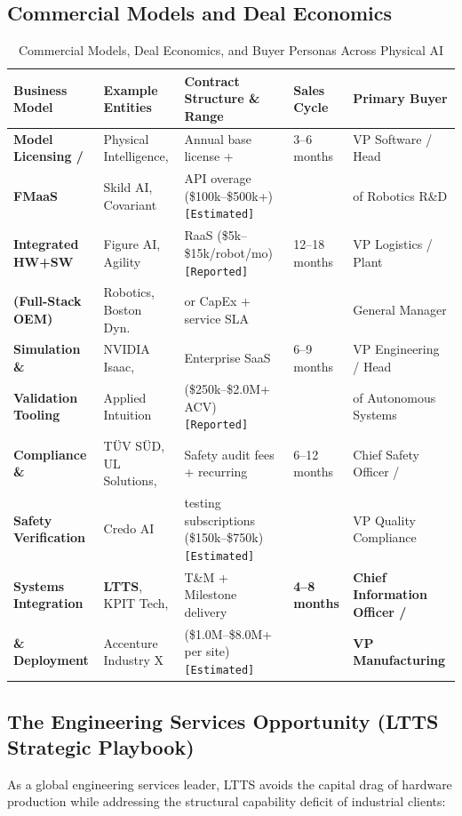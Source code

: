 \documentclass[11pt,a4paper]{article}
\begin{document}
\subsection{Commercial Models and Deal Economics}
\begin{table}[h!]
\centering
\small
\begin{tabularx}{\textwidth}{@{}l p{3.2cm} p{3.4cm} l p{3.2cm}@{}}
\toprule
\textbf{Business Model} & \textbf{Example Entities} & \textbf{Contract Structure \& Range} & \textbf{Sales Cycle} & \textbf{Primary Buyer} \\
\midrule
\textbf{Model Licensing /} & Physical Intelligence, & Annual base license + & 3--6 months & VP Software / Head \\
\textbf{FMaaS} & Skild AI, Covariant & API overage (\$100k--\$500k+) \texttt{[Estimated]} & & of Robotics R\&D \\
\addlinespace
\textbf{Integrated HW+SW} & Figure AI, Agility & RaaS (\$5k--\$15k/robot/mo) \texttt{[Reported]} & 12--18 months & VP Logistics / Plant \\
\textbf{(Full-Stack OEM)} & Robotics, Boston Dyn. & or CapEx + service SLA & & General Manager \\
\addlinespace
\textbf{Simulation \&} & NVIDIA Isaac, & Enterprise SaaS & 6--9 months & VP Engineering / Head \\
\textbf{Validation Tooling} & Applied Intuition & (\$250k--\$2.0M+ ACV) \texttt{[Reported]} & & of Autonomous Systems \\
\addlinespace
\textbf{Compliance \&} & TÜV SÜD, UL Solutions, & Safety audit fees + recurring & 6--12 months & Chief Safety Officer / \\
\textbf{Safety Verification} & Credo AI & testing subscriptions (\$150k--\$750k) \texttt{[Estimated]} & & VP Quality Compliance \\
\addlinespace
\textbf{Systems Integration} & \textbf{LTTS}, KPIT Tech, & T\&M + Milestone delivery & \textbf{4--8 months} & \textbf{Chief Information Officer /} \\
\textbf{\& Deployment} & Accenture Industry X & (\$1.0M--\$8.0M+ per site) \texttt{[Estimated]} & & \textbf{VP Manufacturing} \\
\bottomrule
\end{tabularx}
\caption{Commercial Models, Deal Economics, and Buyer Personas Across Physical AI}
\end{table}

\subsection{The Engineering Services Opportunity (LTTS Strategic Playbook)}
As a global engineering services leader, LTTS avoids the capital drag of hardware production while addressing the structural capability deficit of industrial clients:
\end{document}
